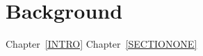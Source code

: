 \documentclass[class=../../utsthesis, crop=false]{standalone}
\begin{document}



\chapter{Background}

Chapter~\ref{INTRO}
Chapter~\ref{SECTIONONE}

\blindtext~\cite{Qb1}
\blindtext~\cite{Qb1}
\blindtext~\cite{Qb1}

\blindtext~\cite{Qb1}
\blindtext~\cite{Qb1}




\putbib
\clearpage

% 
% 
\end{document}
